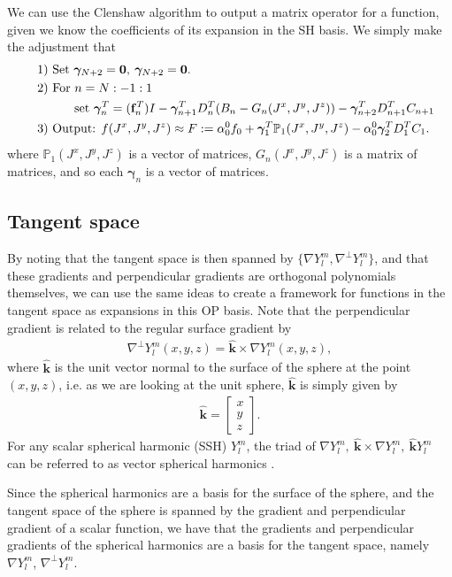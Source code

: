 \documentclass[11pt, oneside]{article}   	%
\newcommand{\Ylm}{Y^m_l}
\newcommand{\bigP}{\mathbb{P}}
\newcommand{\gradYlm}{\nabla Y^m_l}
\newcommand{\gradpYlm}{\nabla^\perp Y^m_l}
\newcommand{\unitvec}{\hat{\bm{k}}}
\begin{document}
We can use the Clenshaw algorithm to output a matrix operator for a function, given we know the coefficients of its expansion in the SH basis. We simply make the adjustment that
\begin{align*}
\quad &\text{1) } \text{Set } \bm{\gamma}_{N+2} = \bold{0}, \: \bm{\gamma}_{N+2} = \bold{0}. \\
\quad &\text{2) } \text{For } n = N:-1:1 \\
\quad & \quad \quad \quad \text{set } \bm{\gamma}_{n}^T = (\bold{f}_n^T)I - \bm{\gamma}_{n+1}^T D^T_n (B_n - G_n(J^x,J^y,J^z)) -  \bm{\gamma}_{n+2}^T D^T_{n+1}C_{n+1} \\
\quad &\text{3) } \text{Output: } f(J^x,J^y,J^z) \approx F := \alpha^0_0 f_0 + \bm{\gamma}_{1}^T \bigP_1(J^x,J^y,J^z) - \alpha^0_0 \bm{\gamma}_{2}^T D^T_1 C_1.
\end{align*}
where $\bigP_1(J^x,J^y,J^z)$ is a vector of matrices, $G_n(J^x,J^y,J^z)$ is a matrix of matrices, and so each $\bm{\gamma}_n$ is a vector of matrices.

\subsection{Tangent space}

By noting that the tangent space is then spanned by $\{\gradYlm, \gradpYlm\}$, and that these gradients and perpendicular gradients are orthogonal polynomials themselves, we can use the same ideas to create a framework for functions in the tangent space as expansions in this OP basis. Note that the perpendicular gradient is related to the regular surface gradient by
\begin{align}
\gradpYlm(x,y,z) = \unitvec \times \gradYlm(x,y,z),
\end{align}
where \(\unitvec\) is the unit vector normal to the surface of the sphere at the point \((x,y,z)\), i.e. as we are looking at the unit sphere, \(\unitvec\) is simply given by
\begin{align}
\unitvec = \begin{bmatrix} x \\ y \\ z \end{bmatrix}.
\end{align}
For any scalar spherical harmonic (SSH) $\Ylm$, the triad of $\gradYlm, \: \unitvec \times \gradYlm, \: \unitvec \Ylm$ can be referred to as vector spherical harmonics \cite{BarreraEtAl}.

Since the spherical harmonics are a basis for the surface of the sphere, and the tangent space of the sphere is spanned by the gradient  and perpendicular gradient of a scalar function, we have that the gradients and perpendicular gradients of the spherical harmonics are a basis for the tangent space, namely \(\gradYlm\), \(\gradpYlm\). 
\end{document}
